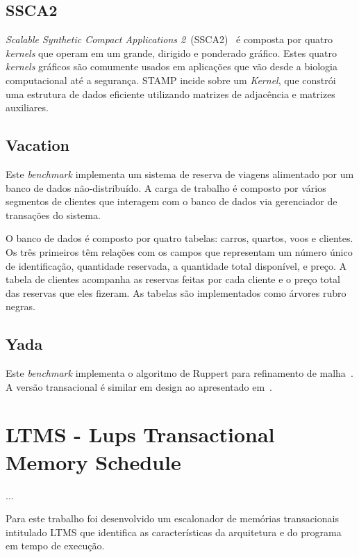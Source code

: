 \documentclass[diss,capa]{texufpel}
\begin{document}
\section{\textbf{SSCA2}}

\emph{Scalable Synthetic Compact Applications 2}~(SSCA2)~\cite{Bader05} é composta por quatro \emph{kernels} que operam em um grande, dirigido e ponderado gráfico. Estes quatro \emph{kernels} gráficos são comumente usados em aplicações que vão desde a biologia computacional até a segurança. STAMP incide sobre um \emph{Kernel}, que constrói uma estrutura de dados eficiente utilizando matrizes de adjacência e matrizes auxiliares.


\section{\textbf{Vacation}}

Este \emph{benchmark} implementa um sistema de reserva de viagens alimentado por um banco de dados não-distribuído. A carga de trabalho é composto por vários segmentos de clientes que interagem com o banco de dados via gerenciador de transações do sistema.

O banco de dados é composto por quatro tabelas: carros, quartos, voos e clientes. Os três primeiros têm relações com os campos que representam um número único de identificação, quantidade reservada, a quantidade total disponível, e preço. A tabela de clientes acompanha as reservas feitas por cada cliente e o preço total das reservas que eles fizeram. As tabelas são implementados como árvores rubro negras.


\section{\textbf{Yada}}

Este \emph{benchmark} implementa o algoritmo de Ruppert para refinamento de malha~\cite{Ruppert95}. A versão transacional é similar em design ao apresentado em~\cite{Kulkarni06}.

\chapter{LTMS - Lups Transactional Memory Schedule}

...

Para este trabalho foi desenvolvido um escalonador de memórias transacionais intitulado LTMS que identifica as características da arquitetura e do programa em tempo de execução.
\end{document}
